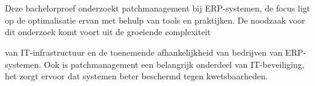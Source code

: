 
%
%
%
%
%

%



\chapter*{}


Deze bachelorproef onderzoekt patchmanagement bij ERP-systemen, de focus ligt op de optimalisatie ervan met behulp van tools en praktijken. De noodzaak voor dit onderzoek komt voort uit de groeiende complexiteit 

van IT-infrastructuur en de toenemende afhankelijkheid van bedrijven van ERP-systemen. Ook is patchmanagement een belangrijk onderdeel van IT-beveiliging, het zorgt ervoor dat systemen beter beschermd tegen kwetsbaarheden.

